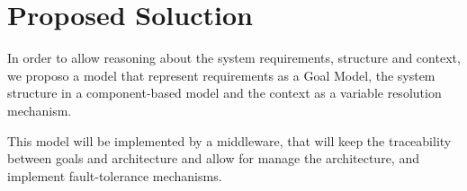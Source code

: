 \section{Proposed Soluction}

In order to allow reasoning about the system requirements, structure and context, we proposo a model that represent requirements as a Goal Model, the system structure in a component-based model and the context as a variable resolution mechanism.

This model will be implemented by a middleware, that will keep the traceability between goals and architecture and allow for manage the architecture, and implement fault-tolerance mechanisms.


\begin{comment}

Finally we explore how to use the middleware support for development of distributed, open-adaptable, opportunistic and evolvable application.

As a support for open-systems, we propose a multi-agent approach in witch agents can collaborate by making peer agents 'strategies' discoverable.

\begin{figure}
  \centering
  \texttt{[image: goalp-agent-repo-rcm-depl]}
  \caption{The proposed agent composition}
  \label{fig:agent_composition}
\end{figure}

We followed an approach with run-time goal model with an mechanism for compositional adaptation and multi-agent collaboration. In our propose adaptiveness is achieved by means of strategies matching an selection at runtime. For more flexibility we propose a symmetric design.

By composable simetry we mean that we should be able to compose strategies in new strategies, and made agents out of strategies and teams out of agents. All with the same interface, transparent for a peer client.

\end{comment}

